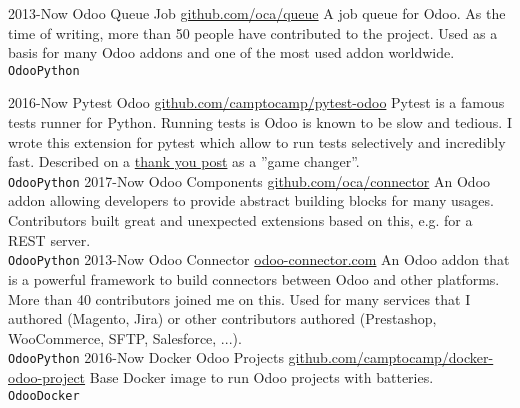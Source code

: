\documentclass[9pt]{developercv} %
\begin{document}
\begin{entrylist}
	\entry
		{2013-Now}
		{Odoo Queue Job}
		{\href{https://github.com/oca/queue}{github.com/oca/queue}}
		{A job queue for Odoo. As the time of writing, more than 50
      people have contributed to the project. Used as a basis for many 
      Odoo addons and one of the most used addon worldwide.\\
      \texttt{Odoo}\slashsep\texttt{Python}
    }

	\entry
		{2016-Now}
		{Pytest Odoo}
		{\href{https://github.com/camptocamp/pytest-odoo}{github.com/camptocamp/pytest-odoo}}
		{Pytest is a famous tests runner for Python. Running tests is Odoo is known
      to be slow and tedious. I wrote this extension for pytest which allow to
      run tests selectively and incredibly fast. Described on a
      \href{https://github.com/camptocamp/pytest-odoo/issues/4}{thank you post}
        as a ''game changer''.\\
      \texttt{Odoo}\slashsep\texttt{Python}
    }
	\entry
		{2017-Now}
		{Odoo Components}
		{\href{https://github.com/OCA/connector/tree/13.0/component}{github.com/oca/connector}}
		{An Odoo addon allowing developers to provide abstract building blocks for
      many usages. Contributors built great and unexpected extensions based on
      this, e.g. for a REST server.\\
      \texttt{Odoo}\slashsep\texttt{Python}
    }
	\entry
		{2013-Now}
		{Odoo Connector}
		{\href{https://odoo-connector.com}{odoo-connector.com}}
		{An Odoo addon that is a powerful framework to build connectors between Odoo
and other platforms. More than 40 contributors joined me on this. Used for many
services that I authored (Magento, Jira) or other contributors authored
(Prestashop, WooCommerce, SFTP, Salesforce, ...).\\
      \texttt{Odoo}\slashsep\texttt{Python}
    }
	\entry
		{2016-Now}
		{Docker Odoo Projects}
		{\href{https://github.com/camptocamp/docker-odoo-project}{github.com/camptocamp/docker-odoo-project}}
		{Base Docker image to run Odoo projects with batteries.\\
      \texttt{Odoo}\slashsep\texttt{Docker}
    }
\end{entrylist}


\end{document}

